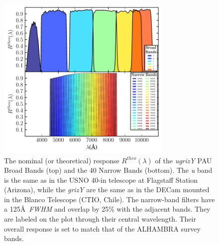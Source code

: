 \begin{figure}
\centering
\includegraphics[width=84mm]{./plots/pau_theo_bands.pdf}
\caption{The nominal (or theoretical) response $R^{theo}(\lambda)$ of the \textit{ugrizY} PAU Broad Bands (top) and the 40 Narrow Bands (bottom). The \textit{u} band is the same as in the USNO 40-in telescope at Flagstaff Station (Arizona), while the \textit{grizY} are the same as in the DECam mounted in the Blanco Telescope (CTIO, Chile). The narrow-band filters have a 125\AA\ {\em FWHM} and overlap by 25\% with the adjacent bands. They are labeled on the plot through their central wavelength. Their overall response is set to match that of the ALHAMBRA survey bands.}
\label{pau_theo_bands}
\end{figure}

